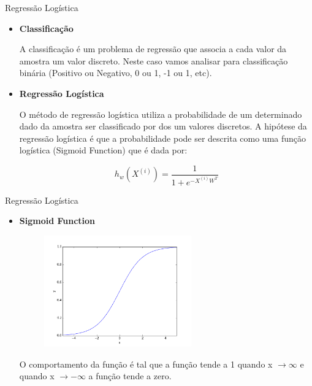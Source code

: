\documentclass{beamer}
\begin{document}
  \begin{frame}{Regressão Logística}
  \begin{itemize}
  \item \textbf{Classificação}
  
  A classificação é um problema de regressão que associa a cada valor da amostra um valor discreto. Neste caso vamos analisar para classificação binária (Positivo ou Negativo, 0 ou 1, -1 ou 1, etc). 
  \item \textbf{Regressão Logística}
  
  O método de regressão logística utiliza a probabilidade de um determinado dado da amostra ser classificado por dos um valores discretos. A hipótese da regressão logística é que a probabilidade pode ser descrita como uma função logística (Sigmoid Function) que é dada por:
 
 \begin{equation}
 	h_w(X^{(i)}) = \frac{1}{1 + e^{-X^{(i)}W^T}}
 \end{equation}
 \end{itemize}
  \end{frame}
  
  \begin{frame}{Regressão Logística}
  \begin{itemize}
  \item \textbf{Sigmoid Function}
  
  \begin{figure}
  \centering 
  \includegraphics[width=0.6\textwidth]{sigmoid.png}
  \end{figure}
  O comportamento da função é tal que a função tende a 1 quando x $\rightarrow \infty$ e quando x $\rightarrow -\infty$  a função tende a zero.
  \end{itemize}
  \end{frame}
  
\end{document}
